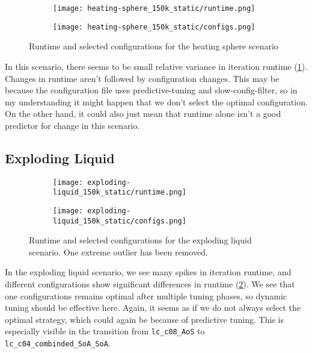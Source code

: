 \documentclass[]{article}
\begin{document}
\begin{figure}[htpb]
	\begin{center}
		\begin{subfigure}[b]{0.45\textwidth}
			\texttt{[image: heating-sphere\_150k\_static/runtime.png]}
		\end{subfigure}
		\begin{subfigure}[b]{0.45\textwidth}
			\texttt{[image: heating-sphere\_150k\_static/configs.png]}
		\end{subfigure}
	\end{center}
	\caption[]{Runtime and selected configurations for the heating sphere scenario}
	\label{fig_hs_overview}
\end{figure}

In this scenario, there seems to be small relative variance in iteration runtime (\ref{fig_hs_overview}). Changes in runtime aren't followed by configuration changes. This may be because the configuration file uses predictive-tuning and slow-config-filter, so in my understanding it might happen that we don't select the optimal configuration. On the other hand, it could also just mean that runtime alone isn't a good predictor for change in this scenario.

\subsection{Exploding Liquid}

\begin{figure}[htpb]
	\begin{center}
		\begin{subfigure}[b]{0.45\textwidth}
			\texttt{[image: exploding-liquid\_150k\_static/runtime.png]}
		\end{subfigure}
		\begin{subfigure}[b]{0.45\textwidth}
			\texttt{[image: exploding-liquid\_150k\_static/configs.png]}
		\end{subfigure}
	\end{center}
	\caption[]{Runtime and selected configurations for the exploding liquid scenario. One extreme outlier has been removed.}
	\label{fig_expl_overview}
\end{figure}
In the exploding liquid scenario, we see many spikes in iteration runtime, and different configurations show significant differences in runtime (\ref{fig_expl_overview}). We see that one configurations remains optimal after multiple tuning phases, so dynamic tuning should be effective here. Again, it seems as if we do not always select the optimal strategy, which could again be because of predictive tuning. This is especially visible in the transition from \texttt{lc\_c08\_AoS} to \texttt{lc\_c04\_combinded\_SoA\_SoA}.
\end{document}

